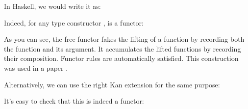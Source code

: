 In Haskell, we would write it as:

Indeed, for any type constructor ,  is a
functor:

As you can see, the free functor fakes the lifting of a function by
recording both the function and its argument. It accumulates the lifted
functions by recording their composition. Functor rules are
automatically satisfied. This construction was used in a paper
.

Alternatively, we can use the right Kan extension for the same purpose:

It's easy to check that this is indeed a functor:

